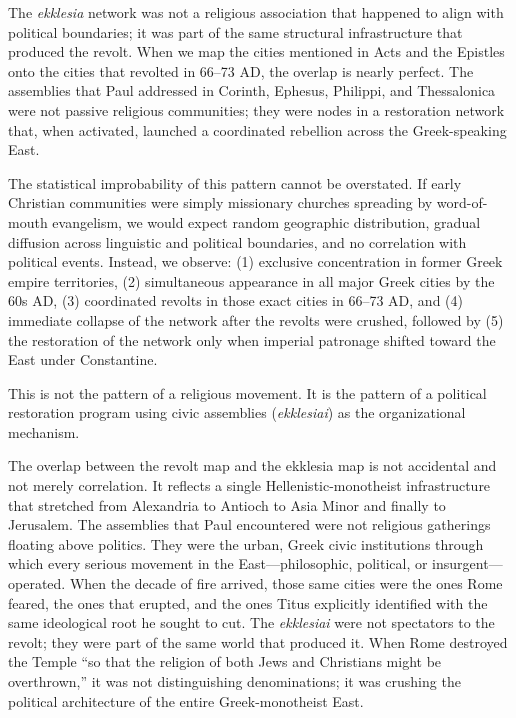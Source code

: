 The \emph{ekklesia} network was not a religious association that happened to align with political boundaries; it was part of the same structural infrastructure that produced the revolt.
When we map the cities mentioned in Acts and the Epistles onto the cities that revolted in 66--73 AD, the overlap is nearly perfect.
The assemblies that Paul addressed in Corinth, Ephesus, Philippi, and Thessalonica were not passive religious communities; they were nodes in a restoration network that, when activated, launched a coordinated rebellion across the Greek-speaking East.

The statistical improbability of this pattern cannot be overstated.
If early Christian communities were simply missionary churches spreading by word-of-mouth evangelism, we would expect random geographic distribution, gradual diffusion across linguistic and political boundaries, and no correlation with political events.
Instead, we observe: (1) exclusive concentration in former Greek empire territories, (2) simultaneous appearance in all major Greek cities by the 60s AD, (3) coordinated revolts in those exact cities in 66--73 AD, and (4) immediate collapse of the network after the revolts were crushed, followed by (5) the restoration of the network only when imperial patronage shifted toward the East under Constantine.

This is not the pattern of a religious movement.
It is the pattern of a political restoration program using civic assemblies (\emph{ekklesiai}) as the organizational mechanism.

The overlap between the revolt map and the ekklesia map is not accidental and not merely correlation.
It reflects a single Hellenistic-monotheist infrastructure that stretched from Alexandria to Antioch to Asia Minor and finally to Jerusalem.
The assemblies that Paul encountered were not religious gatherings floating above politics.
They were the urban, Greek civic institutions through which every serious movement in the East---philosophic, political, or insurgent---operated.
When the decade of fire arrived, those same cities were the ones Rome feared, the ones that erupted, and the ones Titus explicitly identified with the same ideological root he sought to cut.
The \emph{ekklesiai} were not spectators to the revolt; they were part of the same world that produced it.
When Rome destroyed the Temple ``so that the religion of both Jews and Christians might be overthrown,'' it was not distinguishing denominations; it was crushing the political architecture of the entire Greek-monotheist East.

